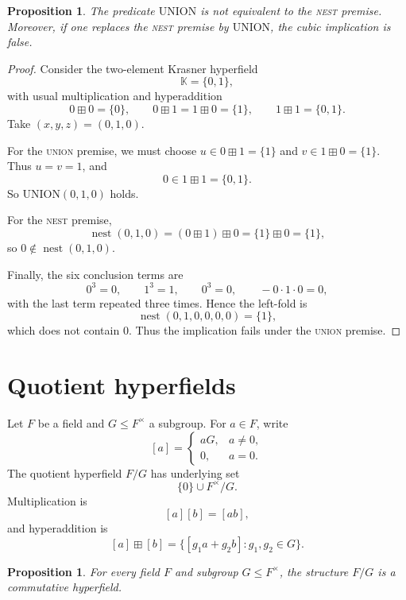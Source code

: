 \documentclass[12pt]{article}
\newtheorem{proposition}[theorem]{Proposition}
\theoremstyle{definition}
\theoremstyle{remark}
\numberwithin{equation}{section}
\newcommand{\nest}{\operatorname{nest}}
\newcommand{\UnionPred}{\mathrm{UNION}}
\begin{document}
\begin{proposition}\label{prop:union-fails}
The predicate \(\UnionPred\) is not equivalent to the \textsc{nest} premise. Moreover, if one replaces the \textsc{nest} premise by \(\UnionPred\), the cubic implication is false.
\end{proposition}

\begin{proof}
Consider the two-element Krasner hyperfield
\[
\mathbb K=\{0,1\},
\]
with usual multiplication and hyperaddition
\[
0\boxplus0=\{0\},\qquad
0\boxplus1=1\boxplus0=\{1\},\qquad
1\boxplus1=\{0,1\}.
\]
Take \((x,y,z)=(0,1,0)\).

For the \textsc{union} premise, we must choose \(u\in0\boxplus1=\{1\}\) and \(v\in1\boxplus0=\{1\}\). Thus \(u=v=1\), and
\[
0\in1\boxplus1=\{0,1\}.
\]
So \(\UnionPred(0,1,0)\) holds.

For the \textsc{nest} premise,
\[
\nest(0,1,0)=(0\boxplus1)\boxplus0=\{1\}\boxplus0=\{1\},
\]
so \(0\notin\nest(0,1,0)\).

Finally, the six conclusion terms are
\[
0^3=0,\qquad 1^3=1,\qquad 0^3=0,\qquad -0\cdot1\cdot0=0,
\]
with the last term repeated three times. Hence the left-fold is
\[
\nest(0,1,0,0,0,0)=\{1\},
\]
which does not contain \(0\). Thus the implication fails under the \textsc{union} premise.
\end{proof}

\section{Quotient hyperfields}\label{sec:quotient}

Let \(F\) be a field and \(G\le F^\times\) a subgroup. For \(a\in F\), write
\[
[a]=
\begin{cases}
aG, & a\neq 0,\\
0, & a=0.
\end{cases}
\]
The quotient hyperfield \(F/G\) has underlying set
\[
\{0\}\cup F^\times/G.
\]
Multiplication is
\[
[a][b]=[ab],
\]
and hyperaddition is
\[
[a]\boxplus[b]=\{[g_1a+g_2b]:g_1,g_2\in G\}.
\]

\begin{proposition}\label{prop:quotient-hyperfield}
For every field \(F\) and subgroup \(G\le F^\times\), the structure \(F/G\) is a commutative hyperfield.
\end{proposition}
\end{document}
